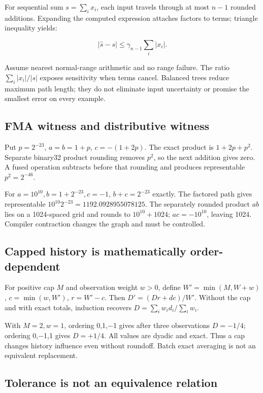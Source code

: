 For sequential sum \(s=\sum_i x_i\), each input travels through at most \(n-1\) rounded additions. Expanding the computed expression attaches factors to terms; triangle inequality yields:

\[
|\widehat s-s|\le\gamma_{n-1}\sum_i|x_i|.
\]

Assume nearest normal-range arithmetic and no range failure. The ratio \(\sum_i|x_i|/|s|\) exposes sensitivity when terms cancel. Balanced trees reduce maximum path length; they do not eliminate input uncertainty or promise the smallest error on every example.

\subsection{FMA witness and distributive witness}\label{03-visual-computing-i-ch018-fma-witness-and-distributive-witness}

Put \(p=2^{-23}\), \(a=b=1+p\), \(c=-(1+2p)\). The exact product is \(1+2p+p^2\). Separate binary32 product rounding removes \(p^2\), so the next addition gives zero. A fused operation subtracts before that rounding and produces representable \(p^2=2^{-46}\).

For \(a=10^{10},b=1+2^{-23},c=-1\), \(b+c=2^{-23}\) exactly. The factored path gives representable \(10^{10}2^{-23}=1192.0928955078125\). The separately rounded product \(ab\) lies on a 1024-spaced grid and rounds to \(10^{10}+1024\); \(ac=-10^{10}\), leaving 1024. Compiler contraction changes the graph and must be controlled.

\subsection{Capped history is mathematically order-dependent}\label{03-visual-computing-i-ch018-capped-history-is-mathematically-order-dependent}

For positive cap \(M\) and observation weight \(w>0\), define \(W'=\min(M,W+w)\), \(c=\min(w,W')\), \(r=W'-c\). Then \(D'=(Dr+dc)/W'\). Without the cap and with exact totals, induction recovers \(D=\sum_iw_id_i/\sum_iw_i\).

With \(M=2,w=1\), ordering 0,1,−1 gives after three observations \(D=-1/4\); ordering 0,−1,1 gives \(D=+1/4\). All values are dyadic and exact. Thus a cap changes history influence even without roundoff. Batch exact averaging is not an equivalent replacement.

\subsection{Tolerance is not an equivalence relation}\label{03-visual-computing-i-ch018-tolerance-is-not-an-equivalence-relation}

